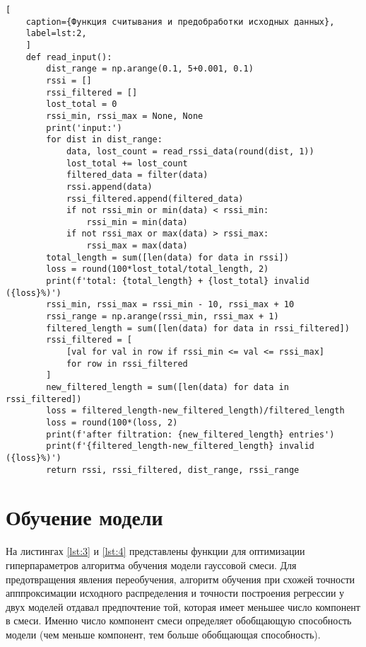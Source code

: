\begin{lstlisting}[
	caption={Функция считывания и предобработки исходных данных},
	label=lst:2,
	]
	def read_input():
		dist_range = np.arange(0.1, 5+0.001, 0.1)
		rssi = []
		rssi_filtered = []
		lost_total = 0
		rssi_min, rssi_max = None, None
		print('input:')
		for dist in dist_range:
			data, lost_count = read_rssi_data(round(dist, 1))
			lost_total += lost_count
			filtered_data = filter(data)
			rssi.append(data)
			rssi_filtered.append(filtered_data)
			if not rssi_min or min(data) < rssi_min:
				rssi_min = min(data)
			if not rssi_max or max(data) > rssi_max:
				rssi_max = max(data)
		total_length = sum([len(data) for data in rssi])
		loss = round(100*lost_total/total_length, 2)
		print(f'total: {total_length} + {lost_total} invalid ({loss}%)')
		rssi_min, rssi_max = rssi_min - 10, rssi_max + 10
		rssi_range = np.arange(rssi_min, rssi_max + 1)
		filtered_length = sum([len(data) for data in rssi_filtered])
		rssi_filtered = [
			[val for val in row if rssi_min <= val <= rssi_max]
			for row in rssi_filtered
		]
		new_filtered_length = sum([len(data) for data in rssi_filtered])
		loss = filtered_length-new_filtered_length)/filtered_length
		loss = round(100*(loss, 2)
		print(f'after filtration: {new_filtered_length} entries')
		print(f'{filtered_length-new_filtered_length} invalid ({loss}%)')
		return rssi, rssi_filtered, dist_range, rssi_range
\end{lstlisting}

\section{Обучение модели}

На листингах \ref{lst:3} и \ref{lst:4} представлены функции для оптимизации гиперпараметров алгоритма обучения модели гауссовой смеси. Для предотвращения явления переобучения, алгоритм обучения при схожей точности апппроксимации исходного распределения и точности построения регрессии у двух моделей отдавал предпочтение той, которая имеет меньшее число компонент в смеси. Именно число компонент смеси определяет обобщающую способность модели (чем меньше компонент, тем больше обобщающая способность).

